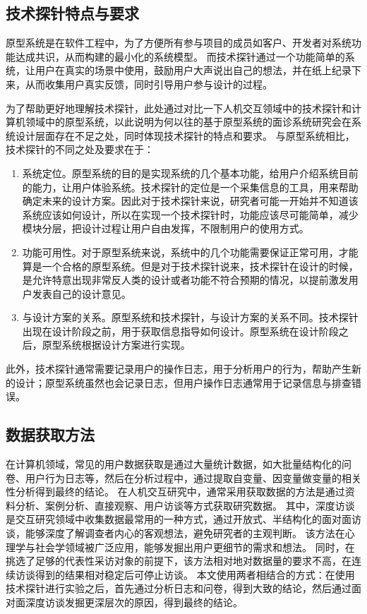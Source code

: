 \subsection{技术探针特点与要求}

原型系统是在软件工程中，为了方便所有参与项目的成员如客户、开发者对系统功能达成共识，从而构建的最小化的系统模型。
而技术探针通过一个功能简单的系统，让用户在真实的场景中使用，鼓励用户大声说出自己的想法，并在纸上纪录下来，从而收集用户真实反馈，同时引导用户参与设计的过程。

为了帮助更好地理解技术探针，此处通过对比一下人机交互领域中的技术探针和计算机领域中的原型系统，以此说明为何以往的基于原型系统的面诊系统研究会在系统设计层面存在不足之处，同时体现技术探针的特点和要求。
与原型系统相比，技术探针的不同之处及要求在于：
\begin{enumerate}
    \item 系统定位。原型系统的目的是实现系统的几个基本功能，给用户介绍系统目前的能力，让用户体验系统。技术探针的定位是一个采集信息的工具，用来帮助确定未来的设计方案。因此对于技术探针来说，研究者可能一开始并不知道该系统应该如何设计，所以在实现一个技术探针时，功能应该尽可能简单，减少模块分层，把设计过程让用户自由发挥，不限制用户的使用方式。

    \item 功能可用性。对于原型系统来说，系统中的几个功能需要保证正常可用，才能算是一个合格的原型系统。但是对于技术探针说来，技术探针在设计的时候，是允许特意出现非常反人类的设计或者功能不符合预期的情况，以提前激发用户发表自己的设计意见。

    \item 与设计方案的关系。原型系统和技术探针，与设计方案的关系不同。技术探针出现在设计阶段之前，用于获取信息指导如何设计。原型系统在设计阶段之后，原型系统根据设计方案进行实现。
\end{enumerate}

此外，技术探针通常需要记录用户的操作日志，用于分析用户的行为，帮助产生新的设计；原型系统虽然也会记录日志，但用户操作日志通常用于记录信息与排查错误。

\subsection{数据获取方法}
在计算机领域，常见的用户数据获取是通过大量统计数据，如大批量结构化的问卷、用户行为日志等，然后在分析过程中，通过提取自变量、因变量做变量的相关性分析得到最终的结论。
在人机交互研究中，通常采用获取数据的方法是通过资料分析、案例分析、直接观察、用户访谈等方式获取研究数据。
其中，深度访谈是交互研究领域中收集数据最常用的一种方式，通过开放式、半结构化的面对面访谈，能够深度了解调查者内心的客观想法，避免研究者的主观判断。
该方法在心理学与社会学领域被广泛应用，能够发掘出用户更细节的需求和想法。
同时，在挑选了足够的代表性采访对象的前提下，该方法相对地对数据量的要求不高，在连续访谈得到的结果相对稳定后可停止访谈\cite{cleary2014data}。
本文使用两者相结合的方式：在使用技术探针进行实验之后，首先通过分析日志和问卷，得到大致的结论，然后通过面对面深度访谈发掘更深层次的原因，得到最终的结论。

